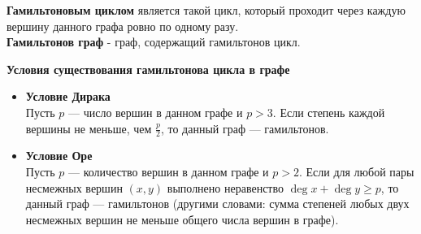 \textbf{Гамильтоновым циклом} является такой цикл, который проходит через каждую вершину данного графа ровно по одному разу.\\
\textbf{Гамильтонов граф} - граф, содержащий гамильтонов цикл.\\
\begin{center}
\textbf{Условия существования гамильтонова цикла в графе}
\end{center}
\begin{itemize}
\item \textbf{Условие Дирака}\\
Пусть $p$ — число вершин в данном графе и $p>3$. Если степень каждой вершины не меньше, чем $\frac{p}{2}$, то данный граф — гамильтонов. 

\item \textbf{Условие Оре}\\	
Пусть $p$ — количество вершин в данном графе и $p>2$. Если для любой пары несмежных вершин $(x, y)$ выполнено неравенство $\deg x + \deg y\geqslant p$, то данный граф — гамильтонов (другими словами: сумма степеней любых двух несмежных вершин не меньше общего числа вершин в графе).
\end{itemize}
